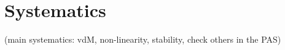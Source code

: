 \section{Systematics}
\label{sec:syst}
(main systematics: vdM, non-linearity, stability, check others in the PAS)
